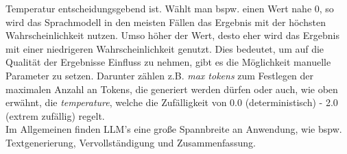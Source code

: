 Temperatur entscheidungsgebend ist. Wählt man bspw. einen Wert nahe 0, so wird das Sprachmodell in den meisten Fällen das Ergebnis mit der höchsten Wahrscheinlichkeit nutzen. Umso höher der Wert, desto eher wird das Ergebnis mit einer niedrigeren Wahrscheinlichkeit genutzt. \cite*{WeightsBiases} Dies bedeutet, um auf die Qualität der Ergebnisse Einfluss zu nehmen, gibt es die Möglichkeit manuelle Parameter zu setzen. Darunter zählen z.B. \textit{max tokens} zum Festlegen der maximalen Anzahl an Tokens, die generiert werden dürfen oder auch, wie oben erwähnt, die \textit{temperature}, welche die Zufälligkeit von 0.0 (deterministisch) - 2.0 (extrem zufällig) regelt.\\ Im Allgemeinen finden LLM's eine große Spannbreite an Anwendung, wie bspw. Textgenerierung, Vervollständigung und Zusammenfassung. \cite*{dhadukHowLargeLanguage2023}

